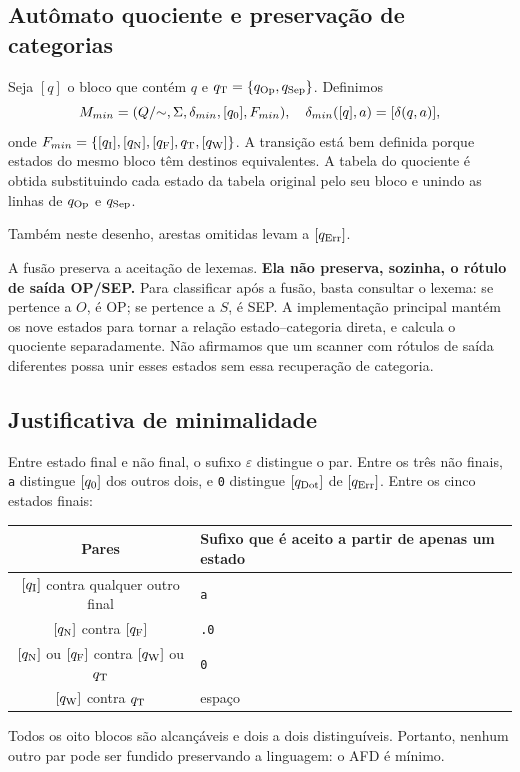 \documentclass[12pt,a4paper]{article}
\begin{document}
\subsection{Autômato quociente e preservação de categorias}
Seja $[q]$ o bloco que contém $q$ e $q_{\mathrm{T}}=\{q_{\mathrm{Op}},q_{\mathrm{Sep}}\}$. Definimos
\[
M_{min}=(Q/{\sim},\Sigma,\delta_{min},[q_{\mathrm{0}}],F_{min}),\quad
\delta_{min}([q],a)=[\delta(q,a)],
\]
onde $F_{min}=\{[q_{\mathrm{I}}],[q_{\mathrm{N}}],[q_{\mathrm{F}}],q_{\mathrm{T}},[q_{\mathrm{W}}]\}$.
A transição está bem definida porque estados do mesmo bloco têm destinos
equivalentes. A tabela do quociente é obtida substituindo cada estado da tabela
original pelo seu bloco e unindo as linhas de $q_{\mathrm{Op}}$ e $q_{\mathrm{Sep}}$.
\begin{center}\end{center}
Também neste desenho, arestas omitidas levam a $[q_{\mathrm{Err}}]$.

A fusão preserva a aceitação de lexemas. \textbf{Ela não preserva, sozinha, o rótulo
de saída OP/SEP.} Para classificar após a fusão, basta consultar o lexema:
se pertence a $O$, é OP; se pertence a $S$, é SEP. A implementação principal
mantém os nove estados para tornar a relação estado--categoria direta, e
calcula o quociente separadamente. Não afirmamos que um scanner com rótulos de
saída diferentes possa unir esses estados sem essa recuperação de categoria.

\subsection{Justificativa de minimalidade}
Entre estado final e não final, o sufixo $\varepsilon$ distingue o par. Entre os
três não finais, \texttt{a} distingue $[q_{\mathrm{0}}]$ dos outros dois, e \texttt{0}
distingue $[q_{\mathrm{Dot}}]$ de $[q_{\mathrm{Err}}]$. Entre os cinco estados finais:
\begin{center}
\begin{tabular}{cl}
\toprule Pares & Sufixo que é aceito a partir de apenas um estado\\\midrule
$[q_{\mathrm{I}}]$ contra qualquer outro final & \texttt{a}\\
$[q_{\mathrm{N}}]$ contra $[q_{\mathrm{F}}]$ & \texttt{.0}\\
$[q_{\mathrm{N}}]$ ou $[q_{\mathrm{F}}]$ contra $[q_{\mathrm{W}}]$ ou $q_{\mathrm{T}}$ & \texttt{0}\\
$[q_{\mathrm{W}}]$ contra $q_{\mathrm{T}}$ & espaço\\\bottomrule
\end{tabular}\end{center}
Todos os oito blocos são alcançáveis e dois a dois distinguíveis. Portanto,
nenhum outro par pode ser fundido preservando a linguagem: o AFD é mínimo.
\end{document}
